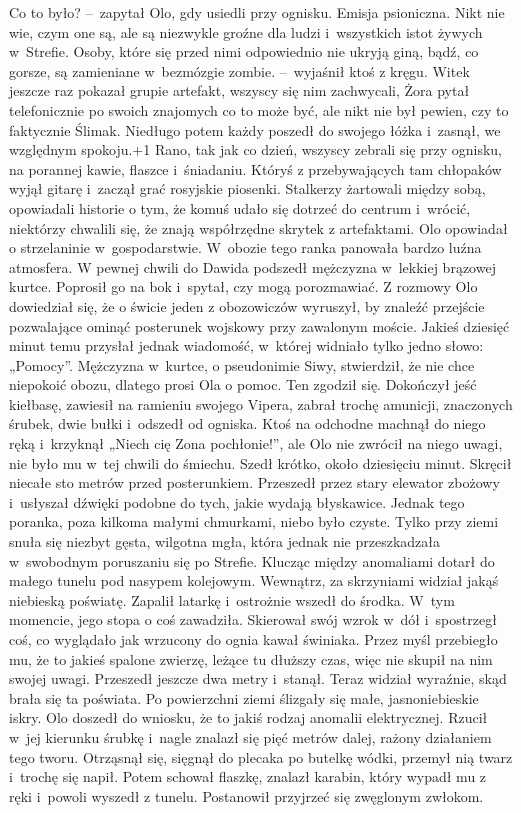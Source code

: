 \documentclass[../MAIN.tex]{subfiles}
\begin{document}
\dd
\sd
\xx Co to było? --~zapytał Olo, gdy usiedli przy ognisku.
\xx Emisja psioniczna. Nikt nie wie, czym one są, ale są niezwykle groźne dla ludzi i~wszystkich istot żywych w~Strefie. Osoby, które się przed nimi odpowiednio nie ukryją giną, bądź, co gorsze, są zamieniane w~bezmózgie zombie. --~wyjaśnił ktoś z kręgu.
\dd
\qd
\mm
Witek jeszcze raz pokazał grupie artefakt, wszyscy się nim zachwycali, Żora pytał telefonicznie po swoich znajomych co to może być, ale nikt nie był pewien, czy to faktycznie Ślimak. Niedługo potem każdy poszedł do swojego łóżka i~zasnął, we względnym spokoju.\looseness+1
\pp
Rano, tak jak co dzień, wszyscy zebrali się przy ognisku, na porannej kawie, flaszce i~śniadaniu. Któryś z przebywających tam chłopaków wyjął gitarę i~zaczął grać rosyjskie piosenki. Stalkerzy żartowali między sobą, opowiadali historie o tym, że komuś udało się dotrzeć do centrum i~wrócić, niektórzy chwalili się, że znają współrzędne skrytek z artefaktami. Olo opowiadał o strzelaninie w~gospodarstwie. W~obozie tego ranka panowała bardzo luźna atmosfera.
\pp
W pewnej chwili do Dawida podszedł mężczyzna w~lekkiej brązowej kurtce. Poprosił go na bok i~spytał, czy mogą porozmawiać. Z rozmowy Olo dowiedział się, że o świcie jeden z obozowiczów wyruszył, by znaleźć przejście pozwalające ominąć posterunek wojskowy przy zawalonym moście. Jakieś dziesięć minut temu przysłał jednak wiadomość, w~której widniało tylko jedno słowo: „Pomocy”. Mężczyzna w~kurtce, o pseudonimie Siwy, stwierdził, że nie chce niepokoić obozu, dlatego prosi Ola o pomoc. Ten zgodził się. Dokończył jeść kiełbasę, zawiesił na ramieniu swojego Vipera, zabrał trochę amunicji, znaczonych śrubek, dwie bułki i~odszedł od ogniska. Ktoś na odchodne machnął do niego ręką i~krzyknął „Niech cię Zona pochłonie!”, ale Olo nie zwrócił na niego uwagi, nie było mu w~tej chwili do śmiechu.
\pp
Szedł krótko, około dziesięciu minut. Skręcił niecałe sto metrów przed posterunkiem. Przeszedł przez stary elewator zbożowy i~usłyszał dźwięki podobne do tych, jakie wydają błyskawice. Jednak tego poranka, poza kilkoma małymi chmurkami, niebo było czyste. Tylko przy ziemi snuła się niezbyt gęsta, wilgotna mgła, która jednak nie przeszkadzała w~swobodnym poruszaniu się po Strefie.
\pp
Klucząc między anomaliami dotarł do małego tunelu pod nasypem kolejowym. Wewnątrz, za skrzyniami widział jakąś niebieską poświatę. Zapalił latarkę i~ostrożnie wszedł do środka. W~tym momencie, jego stopa o coś zawadziła. Skierował swój wzrok w~dół i~spostrzegł coś, co wyglądało jak wrzucony do ognia kawał świniaka. Przez myśl przebiegło mu, że to jakieś spalone zwierzę, leżące tu dłuższy czas, więc nie skupił na nim swojej uwagi. Przeszedł jeszcze dwa metry i~stanął. Teraz widział wyraźnie, skąd brała się ta poświata. Po powierzchni ziemi ślizgały się małe, jasnoniebieskie iskry. Olo doszedł do wniosku, że to jakiś rodzaj anomalii elektrycznej. Rzucił w~jej kierunku śrubkę i~nagle znalazł się pięć metrów dalej, rażony działaniem tego tworu. Otrząsnął się, sięgnął do plecaka po butelkę wódki, przemył nią twarz i~trochę się napił. Potem schował flaszkę, znalazł karabin, który wypadł mu z ręki i~powoli wyszedł z tunelu. Postanowił przyjrzeć się zwęglonym zwłokom.
\end{document}
